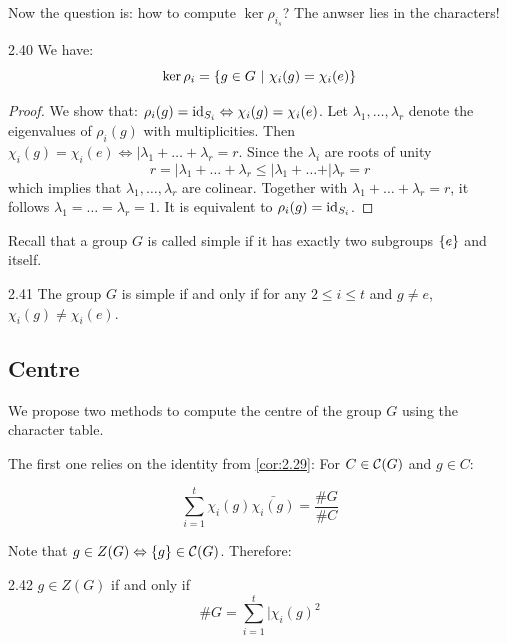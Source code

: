 \documentclass[twoside = false,	%
		headsepline,		%
		parskip = true,
		]{scrbook}						%
\begin{document}
        Now the question is: how to compute $\ker\rho_{i_s}$? The anwser lies in the characters!
        
        \begin{lemma}{}{2.40}
            We have: $$\ker\rho_i = \left\{  g\in G \ | \ \chi_i(g)=\chi_i(e)\right\}$$     
        \end{lemma}
        \begin{proof}
            We show that: $\rho_i(g)=\mathrm{id}_{S_i} \Leftrightarrow \chi_i(g)=\chi_i(e)$.
            Let $\lambda_1,\dots, \lambda_r$ denote the eigenvalues of $\rho_i(g)$ with multiplicities. Then $\chi_i(g)=\chi_i(e) \Leftrightarrow \vert{\lambda_1 + \dots + \lambda_r} = r$. Since the $\lambda_i$ are roots of unity
            $$r=\vert{\lambda_1+\dots+\lambda_r}\leq\vert{\lambda_1}+\dots+\vert{\lambda_r}=r$$
            which implies that $\lambda_1,\dots,\lambda_r$ are colinear. Together with $\lambda_1+\dots +\lambda_r=r$, it follows $\lambda_1=\dots =\lambda_r=1$. It is equivalent to $\rho_i(g)=\mathrm{id}_{S_i}$.
        \end{proof}
    
        Recall that a group $G$ is called simple if it has exactly two subgroups $\left\{ e\right\}$ and itself.
        
        \begin{corollary}{}{2.41}
            The group $G$ is simple if and only if for any $2\leq i \leq t$ and $g\neq e$, $\chi_i(g)\neq \chi_i(e)$.     
        \end{corollary}
        
    \subsection{Centre}

        We propose two methods to compute the centre of the group $G$ using the character table.

        The first one relies on the identity from \ref{cor:2.29}: For $C\in\mathcal C(G)$ and $g\in C$:
        
        $$\sum_{i=1}^t \chi_i(g)\bar{\chi_i(g)}=\frac{\#G}{\#C}$$

        Note that $g\in Z(G)\Leftrightarrow \left\{ g\right\} \in \mathcal C(G)$. Therefore:
        
        \begin{corollary}{}{2.42}
            $g\in Z(G)$ if and only if $$\#G=\sum_{i=1}^t\vert{\chi_i(g)}^2$$
        \end{corollary}
\end{document}
